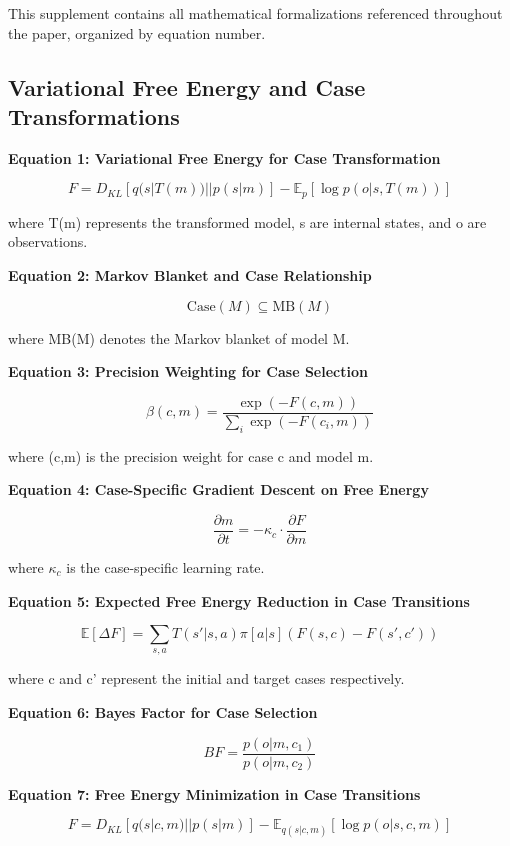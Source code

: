 \documentclass[
  11pt,
  letterpaper,
]{article}
\begin{document}
This supplement contains all mathematical formalizations referenced
throughout the paper, organized by equation number.

\hypertarget{variational-free-energy-and-case-transformations}{%
\subsection{Variational Free Energy and Case
Transformations}\label{variational-free-energy-and-case-transformations}}

\textbf{Equation 1: Variational Free Energy for Case Transformation}

\[
F = D_{KL}[q(s|T(m))||p(s|m)] - \mathbb{E}_{p}[\log p(o|s,T(m))]  \tag{1}
\]

where T(m) represents the transformed model, s are internal states, and
o are observations.

\textbf{Equation 2: Markov Blanket and Case Relationship}

\[\text{Case}(M) \subseteq \text{MB}(M)  \tag{2}\]

where MB(M) denotes the Markov blanket of model M.

\textbf{Equation 3: Precision Weighting for Case Selection}

\[\beta(c,m) = \frac{\exp(-F(c,m))}{\sum_{i}\exp(-F(c_i,m))}  \tag{3}\]

where (c,m) is the precision weight for case c and model m.

\textbf{Equation 4: Case-Specific Gradient Descent on Free Energy}

\[\frac{\partial m}{\partial t} = -\kappa_c \cdot \frac{\partial F}{\partial m}  \tag{4}\]

where \(\kappa_c\) is the case-specific learning rate.

\textbf{Equation 5: Expected Free Energy Reduction in Case Transitions}

\[
\mathbb{E}[\Delta F] = \sum_{s,a}T(s'|s,a)\pi[a|s](F(s,c)-F(s',c'))  \tag{5}
\]

where c and c' represent the initial and target cases respectively.

\textbf{Equation 6: Bayes Factor for Case Selection}

\[BF = \frac{p(o|m,c_1)}{p(o|m,c_2)}  \tag{6}\]

\textbf{Equation 7: Free Energy Minimization in Case Transitions}

\[
F = D_{KL}[q(s|c,m) || p(s|m)] - \mathbb{E}_{q(s|c,m)}[\log p(o|s,c,m)]  \tag{7}
\]
\end{document}
